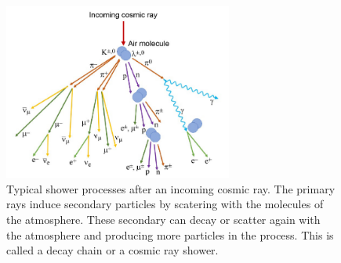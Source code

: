 \begin{figure}
    \centering
    \includegraphics[width=0.67\textwidth]{figures/cascade.png}
    \caption{Typical shower processes after an incoming cosmic ray. The primary rays induce secondary particles by scatering with the 
    molecules of the atmosphere. These secondary can decay or scatter again with the atmosphere and producing more particles in the process. 
    This is called a decay chain or a cosmic ray shower\cite{nasa}.}
    \label{fig:cosmic_ray_showers}
\end{figure}